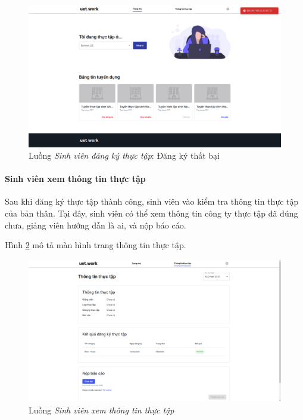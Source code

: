 \documentclass[./../main.tex]{subfiles}
\begin{document}
\begin{figure}[]
	\includegraphics[width=\linewidth]{./images/image40.png}
	\caption{Luồng \emph{Sinh viên đăng ký thực tập}: Đăng ký thất bại}
	\label{fig:student_register_company_failed}
\end{figure}

\paragraph*{Sinh viên xem thông tin thực tập}
Sau khi đăng ký thực tập thành công, sinh viên vào kiểm tra thông tin thực tập của bản thân. Tại đây, sinh viên có thể xem thông tin công ty thực tập đã đúng chưa, giảng viên hướng dẫn là ai, và nộp báo cáo.

Hình \ref{fig:view_internship_page} mô tả màn hình trang thông tin thực tập.

\begin{figure}[]
	\includegraphics[width=\linewidth]{./images/image17.png}
	\caption{Luồng \emph{Sinh viên xem thông tin thực tập}}
	\label{fig:view_internship_page}
\end{figure}
\end{document}
